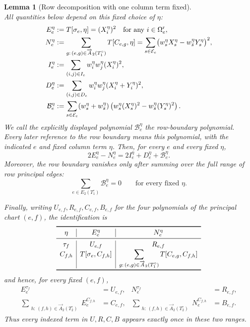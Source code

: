 \documentclass[11pt]{article}
\newtheorem{lemma}[theorem]{Lemma}
\begin{document}
\begin{lemma}[Row decomposition with one column term fixed]
\[\]
All quantities below depend on this fixed choice of $\eta$:
\begin{align*}
E_e^\eta&:=T[\sigma_e,\eta]=(X_i^\eta)^2
 \quad\text{for any }i\in\Omega_e^{\rm r},\\
N_e^\eta&:=\sum_{\substack{g:\,(e,g)\in
 \overrightarrow A_2(T_1^\circ)}}T[C_{e,g},\eta]
 =\sum_{s\in\mathcal E_e}
 \bigl(w_s^\eta X_s^\eta-w_{\bar s}^\eta Y_s^\eta\bigr)^2,\\
I_e^\eta&:=\sum_{(i,j)\in I_e}
 w_i^\eta w_j^\eta(X_i^\eta)^2,\\
D_e^\eta&:=\sum_{(i,j)\in D_e}
 w_i^\eta w_j^\eta(X_i^\eta+Y_i^\eta)^2,\\
\mathcal B_e^\eta&:=\sum_{s\in\mathcal E_e}
 (w_s^\eta+w_{\bar s}^\eta)
 \left(w_s^\eta(X_s^\eta)^2
       -w_{\bar s}^\eta(Y_s^\eta)^2\right).
\end{align*}
We call the explicitly displayed polynomial $\mathcal B_e^\eta$ the
\emph{row-boundary polynomial}.  Every later reference to the row boundary
means this polynomial, with the indicated $e$ and fixed column term $\eta$.
Then, for every $e$ and every fixed $\eta$,
\begin{equation}\label{eq:occurrence-row-settlement}
 2E_e^\eta-N_e^\eta
 =2I_e^\eta+D_e^\eta+\mathcal B_e^\eta.
\tag{A.29c$_0$}
\end{equation}
Moreover, the row boundary vanishes only after summing over the full range of row
principal edges:
\begin{equation}\label{eq:fixed-occurrence-boundary-cancellation}
 \sum_{e\in E_2(T_1^\circ)}\mathcal B_e^\eta=0
 \qquad\text{for every fixed }\eta.
\tag{A.29c$_1$}
\end{equation}

Finally, writing $U_{e,f},R_{e,f},C_{e,f},B_{e,f}$ for the four
polynomials of the principal chart $(e,f)$, the identification is
\[
\begin{array}{c|c|c}
\toprule
\eta&E_e^\eta&N_e^\eta\\
\midrule
\tau_f&U_{e,f}&R_{e,f}\\
C_{f,h}&T[\sigma_e,C_{f,h}]&
\displaystyle\sum_{\substack{g:\,(e,g)\in
\overrightarrow A_2(T_1^\circ)}}T[C_{e,g},C_{f,h}]\\
\bottomrule
\end{array}
\]
and hence, for every fixed $(e,f)$,
\begin{equation}\label{eq:occurrence-URCB-decomposition}
\begin{aligned}
E_e^{\tau_f}&=U_{e,f},&
N_e^{\tau_f}&=R_{e,f},\\
\sum_{\substack{h:\,(f,h)\in\overrightarrow A_2(T_2^\circ)}}
 E_e^{C_{f,h}}&=C_{e,f},&
\sum_{\substack{h:\,(f,h)\in\overrightarrow A_2(T_2^\circ)}}
 N_e^{C_{f,h}}&=B_{e,f}.
\end{aligned}
\tag{A.29c$_2$}
\end{equation}
Thus every indexed term in $U,R,C,B$ appears exactly once in these two
ranges.
\end{lemma}
\end{document}
